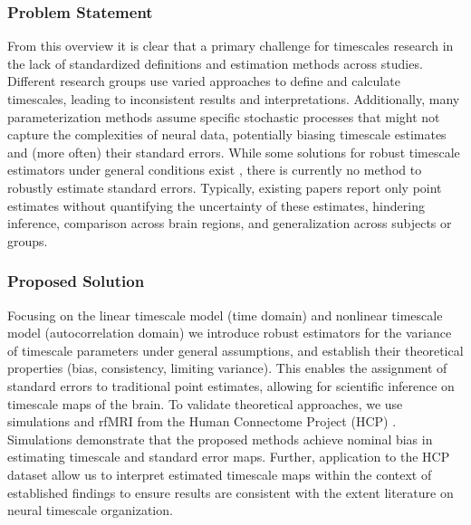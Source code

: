 \documentclass[latex/main.tex]{subfiles}
\begin{document}
\subsubsection*{Problem Statement}
From this overview it is clear that a primary challenge for timescales research in the lack of standardized definitions and estimation methods across studies. Different research groups use varied approaches to define and calculate timescales, leading to inconsistent results and interpretations. Additionally, many parameterization methods assume specific stochastic processes that might not capture the complexities of neural data, potentially biasing timescale estimates and (more often) their standard errors. While some solutions for robust timescale estimators under general conditions exist \cite{zeraati_flexible_2022, donoghue_parameterizing_2020, gao_neuronal_2020}, there is currently no method to robustly estimate standard errors. Typically, existing papers report only point estimates without quantifying the uncertainty of these estimates, hindering inference, comparison across brain regions, and generalization across subjects or groups.\\

\subsubsection*{Proposed Solution}
Focusing on the linear timescale model (time domain) and nonlinear timescale model (autocorrelation domain) we introduce robust estimators for the variance of timescale parameters under general assumptions, and establish their theoretical properties (bias, consistency, limiting variance). This enables the assignment of standard errors to traditional point estimates, allowing for scientific inference on timescale maps of the brain. To validate theoretical approaches, we use simulations and rfMRI from the Human Connectome Project (HCP) \cite{van_essen_wu-minn_2013}. Simulations demonstrate that the proposed methods achieve nominal bias in estimating timescale and standard error maps. Further, application to the HCP dataset allow us to interpret estimated timescale maps within the context of established findings to ensure results are consistent with the extent literature on neural timescale organization.\\
\end{document}
